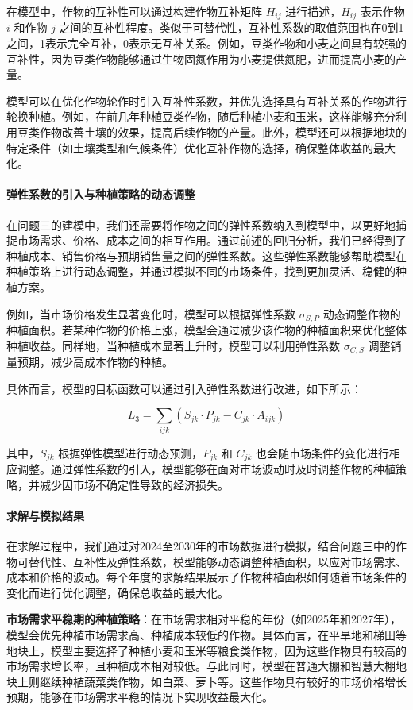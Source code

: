 \documentclass[12pt,a4paper]{nmmcm}
\begin{document}
在模型中，作物的互补性可以通过构建作物互补矩阵 $H_{ij}$ 进行描述，$H_{ij}$ 表示作物 $i$ 和作物 $j$ 之间的互补性程度。类似于可替代性，互补性系数的取值范围也在0到1之间，1表示完全互补，0表示无互补关系。例如，豆类作物和小麦之间具有较强的互补性，因为豆类作物能够通过生物固氮作用为小麦提供氮肥，进而提高小麦的产量。

模型可以在优化作物轮作时引入互补性系数，并优先选择具有互补关系的作物进行轮换种植。例如，在前几年种植豆类作物，随后种植小麦和玉米，这样能够充分利用豆类作物改善土壤的效果，提高后续作物的产量。此外，模型还可以根据地块的特定条件（如土壤类型和气候条件）优化互补作物的选择，确保整体收益的最大化。

\paragraph{弹性系数的引入与种植策略的动态调整}

在问题三的建模中，我们还需要将作物之间的弹性系数纳入到模型中，以更好地捕捉市场需求、价格、成本之间的相互作用。通过前述的回归分析，我们已经得到了种植成本、销售价格与预期销售量之间的弹性系数。这些弹性系数能够帮助模型在种植策略上进行动态调整，并通过模拟不同的市场条件，找到更加灵活、稳健的种植方案。

例如，当市场价格发生显著变化时，模型可以根据弹性系数 $\sigma_{S,P}$ 动态调整作物的种植面积。若某种作物的价格上涨，模型会通过减少该作物的种植面积来优化整体种植收益。同样地，当种植成本显著上升时，模型可以利用弹性系数 $\sigma_{C,S}$ 调整销量预期，减少高成本作物的种植。

具体而言，模型的目标函数可以通过引入弹性系数进行改进，如下所示：

\[
  L_3 = \sum_{ijk} \left( S_{jk} \cdot P_{jk} - C_{jk} \cdot A_{ijk} \right)
\]

其中，$S_{jk}$ 根据弹性模型进行动态预测，$P_{jk}$ 和 $C_{jk}$ 也会随市场条件的变化进行相应调整。通过弹性系数的引入，模型能够在面对市场波动时及时调整作物的种植策略，并减少因市场不确定性导致的经济损失。

\paragraph{求解与模拟结果}

在求解过程中，我们通过对2024至2030年的市场数据进行模拟，结合问题三中的作物可替代性、互补性及弹性系数，模型能够动态调整种植面积，以应对市场需求、成本和价格的波动。每个年度的求解结果展示了作物种植面积如何随着市场条件的变化而进行优化调整，确保总收益的最大化。

\textbf{市场需求平稳期的种植策略}：在市场需求相对平稳的年份（如2025年和2027年），模型会优先种植市场需求高、种植成本较低的作物。具体而言，在平旱地和梯田等地块上，模型主要选择了种植小麦和玉米等粮食类作物，因为这些作物具有较高的市场需求增长率，且种植成本相对较低。与此同时，模型在普通大棚和智慧大棚地块上则继续种植蔬菜类作物，如白菜、萝卜等。这些作物具有较好的市场价格增长预期，能够在市场需求平稳的情况下实现收益最大化。
\end{document}
